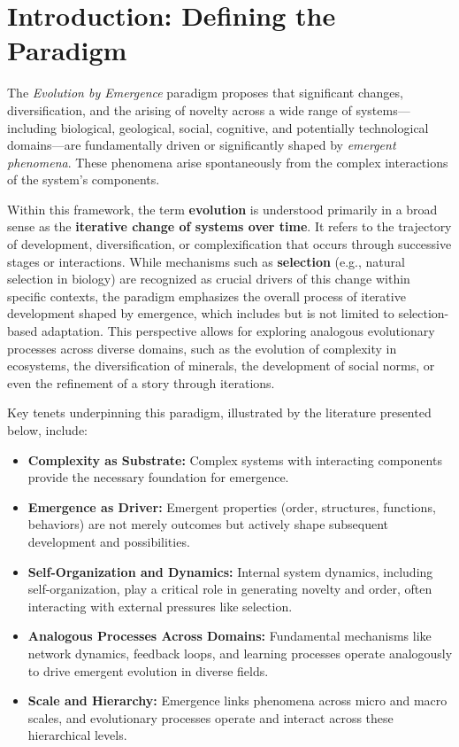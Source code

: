 \documentclass[12pt,openany]{book}
\begin{document}
\section{Introduction: Defining the Paradigm} \label{sec:introduction}

The \emph{Evolution by Emergence} paradigm proposes that significant changes, diversification, and the arising of novelty across a wide range of systems—including biological, geological, social, cognitive, and potentially technological domains—are fundamentally driven or significantly shaped by \emph{emergent phenomena}. These phenomena arise spontaneously from the complex interactions of the system's components.

Within this framework, the term \textbf{evolution} is understood primarily in a broad sense as the \textbf{iterative change of systems over time}. It refers to the trajectory of development, diversification, or complexification that occurs through successive stages or interactions. While mechanisms such as \textbf{selection} (e.g., natural selection in biology) are recognized as crucial drivers of this change within specific contexts, the paradigm emphasizes the overall process of iterative development shaped by emergence, which includes but is not limited to selection-based adaptation. This perspective allows for exploring analogous evolutionary processes across diverse domains, such as the evolution of complexity in ecosystems, the diversification of minerals, the development of social norms, or even the refinement of a story through iterations.

Key tenets underpinning this paradigm, illustrated by the literature presented below, include:
\begin{itemize}
    \item \textbf{Complexity as Substrate:} Complex systems with interacting components provide the necessary foundation for emergence.
    \item \textbf{Emergence as Driver:} Emergent properties (order, structures, functions, behaviors) are not merely outcomes but actively shape subsequent development and possibilities.
    \item \textbf{Self-Organization and Dynamics:} Internal system dynamics, including self-organization, play a critical role in generating novelty and order, often interacting with external pressures like selection.
    \item \textbf{Analogous Processes Across Domains:} Fundamental mechanisms like network dynamics, feedback loops, and learning processes operate analogously to drive emergent evolution in diverse fields.
    \item \textbf{Scale and Hierarchy:} Emergence links phenomena across micro and macro scales, and evolutionary processes operate and interact across these hierarchical levels.
\end{itemize}
\end{document}
